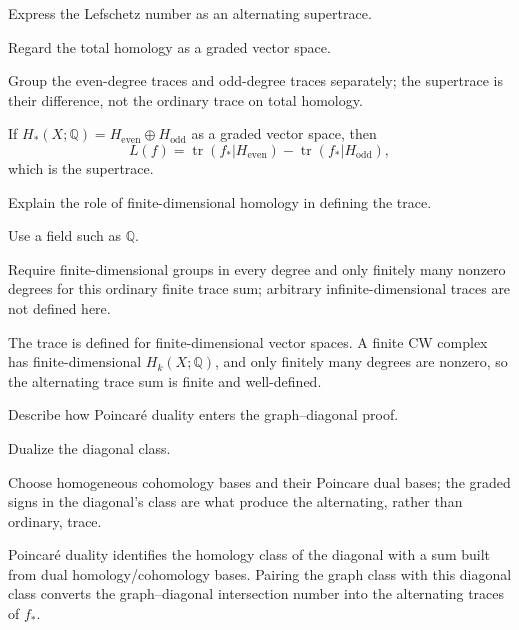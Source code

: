 \begin{exercise}\label{exr:viii35-21}
Express the Lefschetz number as an alternating supertrace.
\end{exercise}
\begin{hint}
Regard the total homology as a graded vector space.

Group the even-degree traces and odd-degree traces separately; the supertrace is their difference, not the ordinary trace on total homology.
\end{hint}
\begin{solution}
If \(H_*(X;\mathbb Q)=H_{\mathrm{even}}\oplus H_{\mathrm{odd}}\) as a graded vector space, then
\[
L(f)=\operatorname{tr}(f_*|H_{\mathrm{even}})
-\operatorname{tr}(f_*|H_{\mathrm{odd}}),
\]
which is the supertrace.
\end{solution}

\begin{exercise}\label{exr:viii35-22}
Explain the role of finite-dimensional homology in defining the trace.
\end{exercise}
\begin{hint}
Use a field such as $\mathbb Q$.

Require finite-dimensional groups in every degree and only finitely many nonzero degrees for this ordinary finite trace sum; arbitrary infinite-dimensional traces are not defined here.
\end{hint}
\begin{solution}
The trace is defined for finite-dimensional vector spaces. A finite CW complex has finite-dimensional \(H_k(X;\mathbb Q)\), and only finitely many degrees are nonzero, so the alternating trace sum is finite and well-defined.
\end{solution}

\begin{exercise}\label{exr:viii35-23}
Describe how Poincaré duality enters the graph--diagonal proof.
\end{exercise}
\begin{hint}
Dualize the diagonal class.

Choose homogeneous cohomology bases and their Poincare dual bases; the graded signs in the diagonal's class are what produce the alternating, rather than ordinary, trace.
\end{hint}
\begin{solution}
Poincaré duality identifies the homology class of the diagonal with a sum built from dual homology/cohomology bases. Pairing the graph class with this diagonal class converts the graph--diagonal intersection number into the alternating traces of \(f_*\).
\end{solution}

